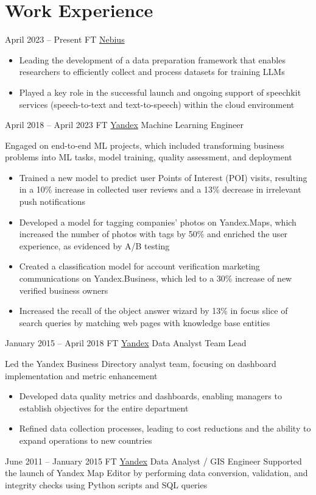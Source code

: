 \section{Work Experience}

\jobentry
    {April 2023 -- Present}
    {FT}
    {\href{https://nebius.ai/about}{Nebius}}
    {\currentPosition}
    {
         \begin{itemize}
		 	\item Leading the development of a data preparation framework that enables researchers to efficiently collect and process datasets for training LLMs
		 	\item Played a key role in the successful launch and ongoing support of speechkit services (speech-to-text and text-to-speech) within the cloud environment
		\end{itemize}
    }

\hrulefill

\jobentry
    {April 2018 -- April 2023}
    {FT}
    {\href{https://yandex.com/company}{Yandex}}
    {Machine Learning Engineer}
    {
        Engaged on end-to-end ML projects, which included transforming business problems into ML tasks, model training, quality assessment, and deployment
        \begin{itemize}
			\item Trained a new model to predict user Points of Interest (POI) visits, resulting in a 10\% increase in collected user reviews and a 13\% decrease in irrelevant push notifications
			\item Developed a model for tagging companies' photos on Yandex.Maps, which increased the number of photos with tags by 50\% and enriched the user experience, as evidenced by A/B testing
            \item Created a classification model for account verification marketing communications on Yandex.Business, which led to a 30\% increase of new verified business owners
            \item Increased the recall of the object answer wizard by 13\% in focus slice of search queries by matching web pages with knowledge base entities
        \end{itemize}
    }

\hrulefill

\jobentry
    {January 2015 -- April 2018}
    {FT}
    {\href{https://yandex.com/company}{Yandex}}
    {Data Analyst Team Lead}
    {
		Led the Yandex Business Directory analyst team, focusing on dashboard implementation and metric enhancement
        \begin{itemize}
            \item Developed data quality metrics and dashboards, enabling managers to establish objectives for the entire department
            \item Refined data collection processes, leading to cost reductions and the ability to expand operations to new countries
        \end{itemize}
    }

\jobentry
    {June 2011 -- January 2015}
    {FT}
    {\href{https://yandex.com/company}{Yandex}}
    {Data Analyst / GIS Engineer}
    {
		Supported the launch of Yandex Map Editor by performing data conversion, validation, and integrity checks using Python scripts and SQL queries
    }
